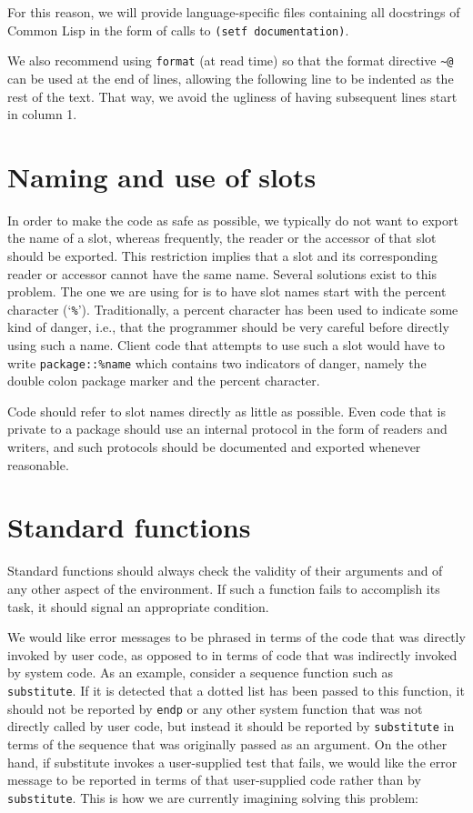 For this reason, we will provide language-specific files containing
all docstrings of Common Lisp in the form of calls to \texttt{(setf
documentation)}.

We also recommend using \texttt{format} (at read time) so that the
format directive \texttt{\~{}@} can be used at the end of lines,
allowing the following line to be indented as the rest of the text.
That way, we avoid the ugliness of having subsequent lines start in
column 1.

\section{Naming and use of slots}

In order to make the code as safe as possible, we typically do not
want to export the name of a slot, whereas frequently, the reader or
the accessor of that slot should be exported.  This restriction
implies that a slot and its corresponding reader or accessor cannot
have the same name.  Several solutions exist to this problem.  The one
we are using for \sysname{} is to have slot names start with the
percent character (`\texttt{\%}').  Traditionally, a percent character
has been used to indicate some kind of danger, i.e., that the
programmer should be very careful before directly using such a name.
Client code that attempts to use such a slot would have to write
\texttt{package::\%name} which contains two indicators of danger,
namely the double colon package marker and the percent character.

Code should refer to slot names directly as little as possible.  Even
code that is private to a package should use an internal protocol in
the form of readers and writers, and such protocols should be
documented and exported whenever reasonable.

\section{Standard functions}

Standard functions should always check the validity of their arguments
and of any other aspect of the environment.  If such a function fails
to accomplish its task, it should signal an appropriate condition.

We would like error messages to be phrased in terms of the code that
was directly invoked by user code, as opposed to in terms of code that
was indirectly invoked by system code.  As an example, consider a
sequence function such as \texttt{substitute}.  If it is detected that
a dotted list has been passed to this function, it should not be
reported by \texttt{endp} or any other system function that was not
directly called by user code, but instead it should be reported by
\texttt{substitute} in terms of the sequence that was originally
passed as an argument.  On the other hand, if substitute invokes a
user-supplied test that fails, we would like the error message to be
reported in terms of that user-supplied code rather than by
\texttt{substitute}.  This is how we are currently imagining solving
this problem:

